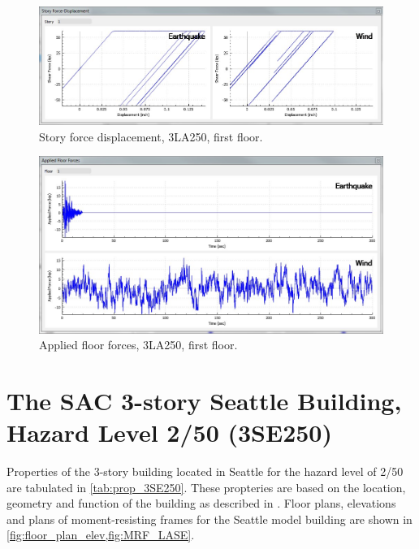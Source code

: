 \documentclass[onecolumn, fleqn]{article}
\begin{document}
\begin{figure}[H]
	\centering \includegraphics[scale=0.35]{3LA250_sfd.JPG}
	\caption{Story force displacement, 3LA250, first floor.}
\end{figure}
\begin{figure}[H]
	\centering \includegraphics[scale=0.35]{3LA250_aff.JPG}
	\caption{Applied floor forces, 3LA250, first floor.}
\end{figure}





\section{The SAC 3-story Seattle Building, Hazard Level 2/50 (3SE250)}
Properties of the 3-story building located in Seattle for the hazard level of 2/50 are tabulated in \cref{tab:prop_3SE250}. These propteries are based on the location, geometry and function of the building as described in \citet{FEMA335c2000}. Floor plans, elevations and plans of moment-resisting frames for the Seattle model building are shown in \cref{fig:floor_plan_elev,fig:MRF_LASE}.
\end{document}
